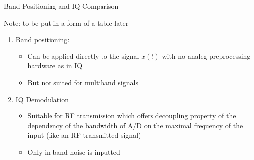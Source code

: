 \begin{frame}[t]{Band Positioning and IQ Comparison}

Note: to be put in a form of a table later

\begin{enumerate}

\item Band positioning:
	
	\begin{itemize}
	\item Can be applied directly to the signal $x(t)$ with no analog preprocessing hardware as in IQ
	
	\item But not suited for multiband signals
	\end{itemize}



\item IQ Demodulation

	\begin{itemize}
	\item Suitable for RF transmission which offers decoupling property of the dependency of the bandwidth of A/D on the maximal frequency of the input (like an RF transmitted signal) 
	
	
	\item Only in-band noise is inputted 
	\end{itemize}


\end{enumerate}


\end{frame}



